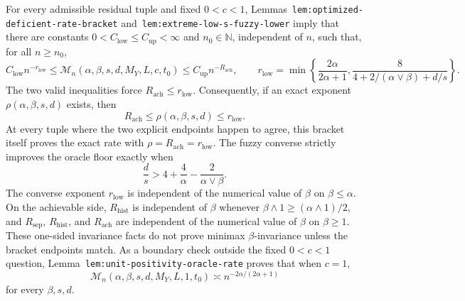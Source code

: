 For every admissible residual tuple and fixed \(0<c<1\), Lemmas~\texttt{lem:optimized-deficient-rate-bracket} and~\texttt{lem:extreme-low-s-fuzzy-lower} imply that there are constants \(0<C_{\mathrm{low}}\le C_{\mathrm{up}}<\infty\) and \(n_0\in\mathbb N\), independent of \(n\), such that, for all \(n\ge n_0\),
\[
C_{\mathrm{low}}n^{-r_{\mathrm{low}}}
\le
\mathcal M_n(\alpha,\beta,s,d,M_Y,L,c,t_0)
\le
C_{\mathrm{up}}n^{-R_{\mathrm{ach}}},
\qquad
r_{\mathrm{low}}
=
\min\left\{
\frac{2\alpha}{2\alpha+1},
\frac{8}{4+2/(\alpha\vee\beta)+d/s}
\right\}.
\]
The two valid inequalities force \(R_{\mathrm{ach}}\le r_{\mathrm{low}}\). Consequently, if an exact exponent \(\rho(\alpha,\beta,s,d)\) exists, then
\[
R_{\mathrm{ach}}
\le
\rho(\alpha,\beta,s,d)
\le
r_{\mathrm{low}}.
\]
At every tuple where the two explicit endpoints happen to agree, this bracket itself proves the exact rate with \(\rho=R_{\mathrm{ach}}=r_{\mathrm{low}}\). The fuzzy converse strictly improves the oracle floor exactly when
\[
\frac ds>4+\frac4\alpha-\frac{2}{\alpha\vee\beta}.
\]
The converse exponent \(r_{\mathrm{low}}\) is independent of the numerical value of \(\beta\) on \(\beta\le\alpha\). On the achievable side, \(R_{\mathrm{hist}}\) is independent of \(\beta\) whenever \(\beta\wedge1\ge(\alpha\wedge1)/2\), and \(R_{\mathrm{sep}}\), \(R_{\mathrm{hist}}\), and \(R_{\mathrm{ach}}\) are independent of the numerical value of \(\beta\) on \(\beta\ge1\). These one-sided invariance facts do not prove minimax \(\beta\)-invariance unless the bracket endpoints match. As a boundary check outside the fixed \(0<c<1\) question, Lemma~\texttt{lem:unit-positivity-oracle-rate} proves that when \(c=1\),
\[
\mathcal M_n(\alpha,\beta,s,d,M_Y,L,1,t_0)
\asymp
n^{-2\alpha/(2\alpha+1)}
\]
for every \(\beta,s,d\).